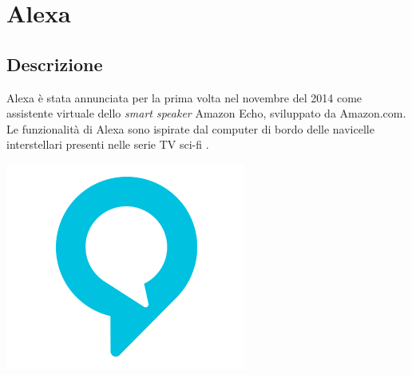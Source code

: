 \documentclass[a4paper,titlepage]{article}
\begin{document}
\newpage
	\section{Alexa}
	\subsection{Descrizione}
	\begin{minipage}{0.7\textwidth}\raggedright
		Alexa è stata annunciata per la prima volta nel novembre del 2014 come assistente virtuale dello \textit{smart speaker} Amazon Echo, sviluppato da Amazon.com.
		Le funzionalità di Alexa sono ispirate dal computer di bordo delle navicelle interstellari presenti nelle serie TV sci-fi .

	\end{minipage}
	\hfill
	\noindent\begin{minipage}{0.1\textwidth}
		\includegraphics[scale=0.3]{images/alexa.png}
	\end{minipage}
\end{document}
